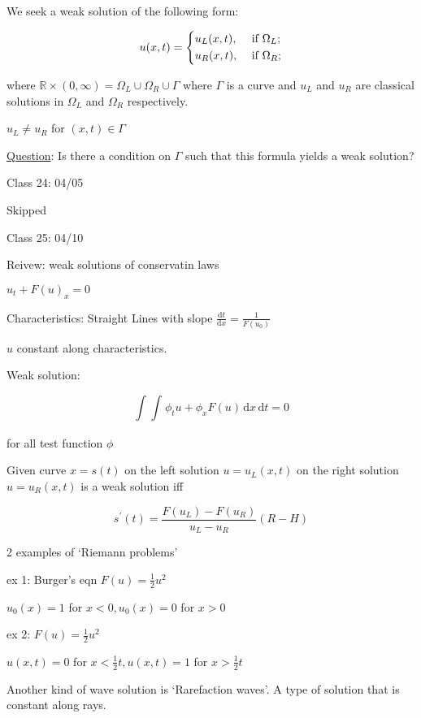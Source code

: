 \documentclass{article}
\theoremstyle{definition}
\begin{document}
We seek a weak solution of the following form:

\[
    u(x,t) = \begin{dcases}
        u_L(x,t), &\text{ if } \Omega_L ;\\
        u_R(x,t), &\text{ if } \Omega_R ;\\
    \end{dcases}
\]

where \(\mathbb{R} \times (0, \infty) = \Omega_L \cup \Omega_R \cup \Gamma\) where \(\Gamma\) is a curve and \(u_L\) and \(u_R\) are classical solutions in \(\Omega_L\) and \(\Omega_R\) respectively.

\(u_L \neq u_R\) for \((x,t)\in \Gamma\)  

\underline{Question}: Is there a condition on \(\Gamma\) such that this formula yields a weak solution?

\hrulefill

Class 24: 04/05

Skipped

\hrulefill

Class 25: 04/10

Reivew: weak solutions of conservatin laws

\(u_t + F(u)_x = 0\) 

Characteristics: Straight Lines with slope \(\frac{\mathrm{d}t}{\mathrm{d}x} = \frac{1}{F(u_0)}\) 

\(u\) constant along characteristics.

Weak solution:

\[
    \int_{}^{} \int_{}^{} \phi_t u + \phi _x F(u) \,\mathrm{d}x  \,\mathrm{d}t = 0 
\]

for all test function \(\phi\) 

Given curve \(x=s(t)\) on the left solution \(u = u_L(x,t)\) on the right solution \(u=u_R(x,t)\) is a weak solution iff

\[
    s^{\prime}(t) = \frac{F(u_L)-F(u_R)}{u_L - u_R}(R-H)
\]

2 examples of `Riemann problems'

ex 1: Burger's eqn \(F(u)=\frac{1}{2}u^2\)

\(u_0(x)=1\) for \(x<0, u_0(x)=0\) for \(x>0\) 

ex 2: \(F(u)=\frac{1}{2}u^2\) 

\(u(x,t)=0\) for \(x<\frac{1}{2}t, u(x,t)=1\) for \(x>\frac{1}{2}t\) 

Another kind of wave solution is `Rarefaction waves'. A type of solution that is constant along rays.
\end{document}
